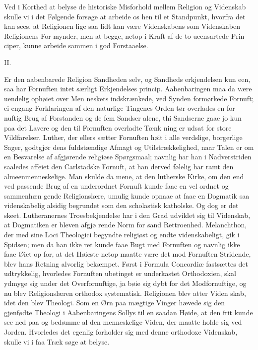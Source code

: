 \documentclass[12pt,a4paper]{article}
\newcommand{\opage}[1]{\marginnote{\footnotesize\textit{[#1]}}}
\begin{document}
Ved i Korthed at belyse de historiske Misforhold mellem
Religion og Videnskab skulle vi i det Følgende forsøge at arbeide
os hen til et Standpunkt, hvorfra det kan sees, at Religionen lige
saa lidt kan være Videnskabens som Videnskaben Religionens For\-%
mynder, men at begge, netop i Kraft af de to ueensartede Prin\-%
ciper, kunne arbeide sammen i god Forstaaelse.

\begin{center}II.\end{center}

Er den aabenbarede Religion Sandheden selv, og Sandheds\-%
erkjendelsen kun een, saa har Fornuften intet særligt Erkjendelses\-%
princip. Aabenbaringen maa da være uendelig ophøiet over Men\-%
neskets indskrænkede, ved Synden formørkede Fornuft; ei engang
Forklaringen af den naturlige Tingenes Orden tør overlades en for\-%
nuftig Brug af Forstanden og de fem Sandser alene, thi Sandserne
gaae jo kun paa det Lavere og den til Fornuften overladte Tænk\-%
ning er udsat for store Vildfarelser. Luther, der ellers sætter
Fornuften høit i alle verdslige, borgerlige Sager, godtgjør dens
fuldstændige Afmagt og Utilstrækkelighed, naar Talen er om en
Besvarelse af afgjørende religiøse Spørgsmaal; navnlig har han i
Nadverstriden saaledes affeiet den Carlstadske Fornuft, at han
derved følelig har ramt den almeenmenneskelige. Man skulde da
mene, at den lutherske Kirke, om den end ved passende Brug af
en underordnet Fornuft kunde faae en vel ordnet og sammenhæn\-%
gende Religionslære, umulig kunde opnaae at faae en Dogmatik
saa videnskabelig alsidig begrundet som den scholastisk katholske.
Og dog er det skeet. Lutheranernes Troesbekjendelse har i den
Grad udviklet sig til Videnskab, at Dogmatiken er bleven afgjø\-%
\opage{18}rende Norm for sand Rettroenhed. Melanchthon, der med sine Loci
Theologici begyndte religiøst og endte videnskabeligt, gik i Spidsen;
men da han ikke ret kunde faae Bugt med Fornuften og navnlig
ikke faae Øiet op for, at det Høieste netop maatte være det mod
Fornuften Stridende, blev hans Retning alvorlig bekæmpet. Først
i Formula Concordiæ fastsættes det udtrykkelig, hvorledes Fornuften
ubetinget er underkastet Orthodoxien, skal ydmyge sig under det
Overfornuftige, ja bøie sig dybt for det Modfornuftige, og nu blev
Religionslæren orthodox systematisk. Religionen blev atter Viden\-%
skab, idet den blev Theologi. Som en Ørn paa mægtige Vinger
hævede sig den gjenfødte Theologi i Aabenbaringens Sollys til en
saadan Høide, at den frit kunde see ned paa og bedømme al den
menneskelige Viden, der maatte holde sig ved Jorden. Hvorledes
det egenlig forholder sig med denne orthodoxe Videnskab, skulle
vi i faa Træk søge at belyse.
\end{document}
